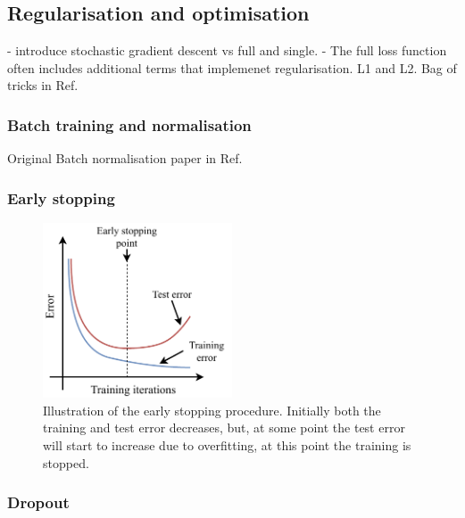\subsection{Regularisation and optimisation} %
\label{sec:cvn_theory_reg} %

- introduce stochastic gradient descent vs full and single.
- The full loss function often includes additional terms that implemenet regularisation. L1 and
L2. Bag of tricks in Ref.~\cite{he2019}

\subsubsection*{Batch training and normalisation}
Original Batch normalisation paper in Ref.~\cite{ioffe2015}

\subsubsection*{Early stopping}

\begin{figure} %
    \includegraphics[width=0.5\textwidth]{diagrams/7-cvn/early_stopping.pdf}
    \caption[Illustration of the early stopping procedure.]
    {Illustration of the early stopping procedure. Initially both the training and test error
        decreases, but, at some point the test error will start to increase due to overfitting, at
        this point the training is stopped.}
    \label{fig:early_stopping}
\end{figure}

\subsubsection*{Dropout}

